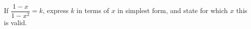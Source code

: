 If $\dfrac{1-x}{1-x^2}=k$, express $k$ in terms of $x$ in simplest form, and state for which $x$ this is valid.
